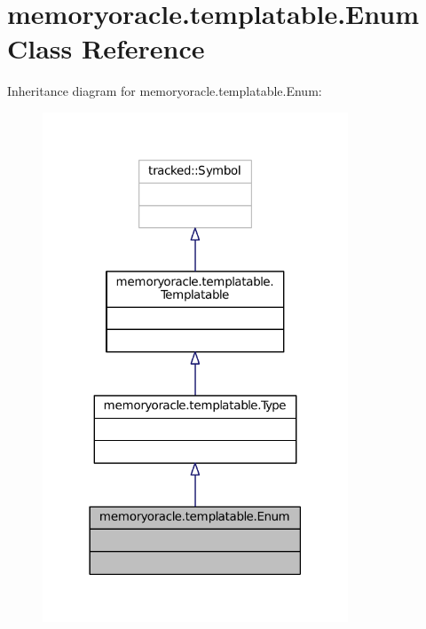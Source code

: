 \hypertarget{classmemoryoracle_1_1templatable_1_1Enum}{}\section{memoryoracle.\+templatable.\+Enum Class Reference}
\label{classmemoryoracle_1_1templatable_1_1Enum}


Inheritance diagram for memoryoracle.\+templatable.\+Enum\+:\nopagebreak
\begin{figure}[H]
\begin{center}
\leavevmode
\includegraphics[width=258pt]{classmemoryoracle_1_1templatable_1_1Enum__inherit__graph}
\end{center}
\end{figure}



